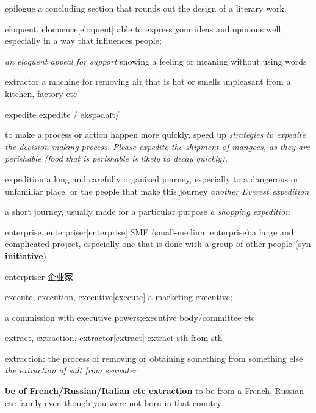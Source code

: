 \begin{DefWord}{epilogue}
    a concluding section that rounds out the design of a literary work.
\end{DefWord}

\begin{DefWord}{eloquent, eloquence}[eloquent]
    able to express your ideas and opinions well, especially in a way that influences people;

\textit{an eloquent appeal for support}
showing a feeling or meaning without using words
\end{DefWord}

\begin{DefWord}{extractor}
    a machine for removing air that is hot or smells unpleasant from a kitchen, factory etc
\end{DefWord}

\begin{DefWord}{expedite}
    expedite /ˈekspədaɪt/

    to make a process or action happen more quickly, speed up
    \textit{strategies to expedite the decision-making process.}
    \textit{Please expedite the shipment of mangoes, as they are perishable (food that is perishable is likely to decay quickly).}
\end{DefWord}

\begin{DefWord}{expedition}
    a long and carefully organized journey, especially to a dangerous or unfamiliar place, or the people that make this journey
    \textit{another Everest expedition}

    a short journey, usually made for a particular purpose
    \textit{a shopping expedition}
\end{DefWord}

\begin{DefWord}{enterprise, enterpriser}[enterprise]
    SME (small-medium enterprise);a large and complicated project, especially one that is done with a group of other people (syn \textbf{initiative})

    enterpriser 企业家
\end{DefWord}

\begin{DefWord}{execute, execution, executive}[execute]
    a marketing executive; 
    
    a commission with executive powers;executive body/committee etc
\end{DefWord}

\begin{DefWord}{extract, extraction, extractor}[extract]
    extract sth from sth

    extraction: the process of removing or obtaining something from something else
    \textit{the extraction of salt from seawater}

    \textbf{be of French/Russian/Italian etc extraction} to be from a French, Russian etc family even though you were not born in that country
\end{DefWord}

